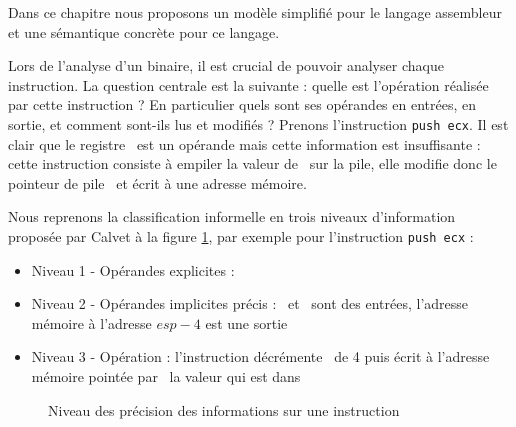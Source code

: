 
Dans ce chapitre nous proposons un modèle simplifié pour le langage assembleur et une sémantique concrète pour ce langage.

Lors de l'analyse d'un binaire, il est crucial de pouvoir analyser chaque instruction.
La question centrale est la suivante : quelle est l'opération réalisée par cette instruction ?
En particulier quels sont ses opérandes en entrées, en sortie, et comment sont-ils lus et modifiés ?
Prenons l'instruction \texttt{push ecx}. 
Il est clair que le registre \ecx\ est un opérande mais cette information est insuffisante : cette instruction consiste à empiler la valeur de \ecx\ sur la pile, elle modifie donc le pointeur de pile \esp\ et écrit à une adresse mémoire.

Nous reprenons la classification informelle en trois niveaux d'information proposée par Calvet \cite{Calvet2013} à la figure \ref{fig:niveaux_sem}, par exemple pour l'instruction \texttt{push ecx} :
\begin{itemize}
 \item Niveau 1 - Opérandes explicites : \ecx
 \item Niveau 2 - Opérandes implicites précis : \ecx\ et \esp\ sont des entrées, l'adresse mémoire à l'adresse $esp-4$ est une sortie
 \item Niveau 3 - Opération : l'instruction décrémente \esp\ de 4 puis écrit à l'adresse mémoire pointée par \esp\ la valeur qui est dans \ecx
\end{itemize}

\begin{figure}
\begin{center}
\end{center}
\caption{Niveau des précision des informations sur une instruction}
\label{fig:niveaux_sem}
\end{figure}

